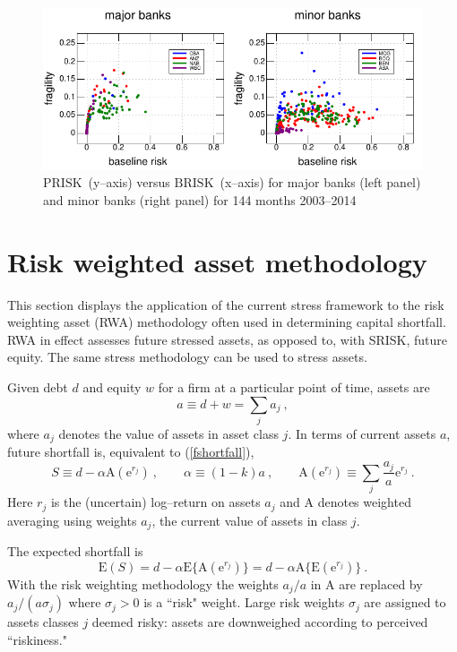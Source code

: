 \documentclass[12pt]{article}
\newcommand{\E}{\mathrm{E}}
\newcommand{\e}{\mathrm{e}}
\newcommand{\Ax}{{\mathrm{A}}}
\newcommand{\br}{\ensuremath{\mathrm{BRISK}}}
\newcommand{\pr}{\ensuremath{\mathrm{PRISK}}}
\newcommand{\eref}[1]{(\ref{#1})}
\newcommand{\cq}{\ , \qquad}
\newcommand{\be}[1]{\begin{equation}\label{#1}}
\newcommand{\ee}{\end{equation}}
\begin{document}
\begin{figure}[htbp]
\begin{center}
\includegraphics[width=16cm]{figures/sysstress.pdf}
\caption{\pr\  (y--axis) versus \br\  (x--axis)   for major banks (left panel) and  minor banks (right panel)  for 144 months 2003--2014}
\label{sysstress}
\end{center}
\end{figure}


\section{Risk weighted asset methodology}\label{riskmethod}

This section displays the application of the current stress framework to  the  risk weighting asset (RWA) methodology often used in determining capital shortfall.   RWA in effect assesses future stressed assets,   as opposed to, with SRISK,  future equity.   The same stress methodology can be used to stress assets.

Given debt $d$ and equity $w$ for a firm at a particular point of time,  assets are
$$
a\equiv d+w=\sum_ja_j\ ,
$$
where $a_j$ denotes the value of assets in asset class $j$.   In terms of current assets $a$, future shortfall is, equivalent to \eref{fshortfall},  
\be{shortfall2}
S\equiv  d-\alpha\Ax(\e^{r_j})\cq \alpha\equiv(1-k)a\cq \Ax(\e^{r_j})\equiv \sum_j\frac{a_j}{a}\e^{r_j}\ .
\ee
Here $r_j$ is the (uncertain) log--return on assets $a_j$ and $\Ax$ denotes weighted averaging using weights $a_j$, the current value of assets in class $j$.

The expected shortfall is 
\be{rw1}
\E(S)=d-\alpha\E\{\Ax(\e^{r_j})\}=d-\alpha\Ax\{\E(\e^{r_j})\}\ .
\ee
With the risk weighting methodology the weights $a_j/a$ in $\Ax$ are replaced by $a_j/(a\sigma_j)$ where $\sigma_j>0$ is a ``risk" weight.   Large risk weights $\sigma_j$ are assigned to  assets classes $j$ deemed risky:  assets are downweighed according to  perceived ``riskiness." 
\end{document}
